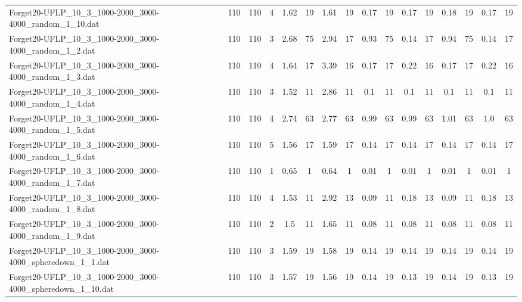 \begin{sidewaystable}[!ht]
{\begin{tabular}{lccccccccccccccc}
Forget20-UFLP\_10\_3\_1000-2000\_3000-4000\_random\_1\_10.dat & 110 & 110 & 4 & 1.62 & 19 & 1.61 & 19 &  \textcolor{blue2}{0.17} & 19 &  \textcolor{blue2}{0.17} & 19 & 0.18 & 19 &  \textcolor{blue2}{0.17} & 19 \\
Forget20-UFLP\_10\_3\_1000-2000\_3000-4000\_random\_1\_2.dat & 110 & 110 & 3 & 2.68 & 75 & 2.94 & 17 & 0.93 & 75 &  \textcolor{blue2}{0.14} & 17 & 0.94 & 75 &  \textcolor{blue2}{0.14} & 17 \\
Forget20-UFLP\_10\_3\_1000-2000\_3000-4000\_random\_1\_3.dat & 110 & 110 & 4 & 1.64 & 17 & 3.39 & 16 &  \textcolor{blue2}{0.17} & 17 & 0.22 & 16 &  \textcolor{blue2}{0.17} & 17 & 0.22 & 16 \\
Forget20-UFLP\_10\_3\_1000-2000\_3000-4000\_random\_1\_4.dat & 110 & 110 & 3 & 1.52 & 11 & 2.86 & 11 & 0.1 & 11 & 0.1 & 11 & 0.1 & 11 & 0.1 & 11 \\
Forget20-UFLP\_10\_3\_1000-2000\_3000-4000\_random\_1\_5.dat & 110 & 110 & 4 & 2.74 & 63 & 2.77 & 63 & 0.99 & 63 & 0.99 & 63 & 1.01 & 63 & 1.0 & 63 \\
Forget20-UFLP\_10\_3\_1000-2000\_3000-4000\_random\_1\_6.dat & 110 & 110 & 5 & 1.56 & 17 & 1.59 & 17 &  \textcolor{blue2}{0.14} & 17 &  \textcolor{blue2}{0.14} & 17 &  \textcolor{blue2}{0.14} & 17 &  \textcolor{blue2}{0.14} & 17 \\
Forget20-UFLP\_10\_3\_1000-2000\_3000-4000\_random\_1\_7.dat & 110 & 110 & 1 & 0.65 & 1 & 0.64 & 1 &  \textcolor{blue2}{0.01} & 1 &  \textcolor{blue2}{0.01} & 1 &  \textcolor{blue2}{0.01} & 1 &  \textcolor{blue2}{0.01} & 1 \\
Forget20-UFLP\_10\_3\_1000-2000\_3000-4000\_random\_1\_8.dat & 110 & 110 & 4 & 1.53 & 11 & 2.92 & 13 &  \textcolor{blue2}{0.09} & 11 & 0.18 & 13 &  \textcolor{blue2}{0.09} & 11 & 0.18 & 13 \\
Forget20-UFLP\_10\_3\_1000-2000\_3000-4000\_random\_1\_9.dat & 110 & 110 & 2 & 1.5 & 11 & 1.65 & 11 &  \textcolor{blue2}{0.08} & 11 &  \textcolor{blue2}{0.08} & 11 &  \textcolor{blue2}{0.08} & 11 &  \textcolor{blue2}{0.08} & 11 \\
Forget20-UFLP\_10\_3\_1000-2000\_3000-4000\_spheredown\_1\_1.dat & 110 & 110 & 3 & 1.59 & 19 & 1.58 & 19 &  \textcolor{blue2}{0.14} & 19 &  \textcolor{blue2}{0.14} & 19 &  \textcolor{blue2}{0.14} & 19 &  \textcolor{blue2}{0.14} & 19 \\
Forget20-UFLP\_10\_3\_1000-2000\_3000-4000\_spheredown\_1\_10.dat & 110 & 110 & 3 & 1.57 & 19 & 1.56 & 19 & 0.14 & 19 &  \textcolor{blue2}{0.13} & 19 & 0.14 & 19 &  \textcolor{blue2}{0.13} & 19 \\

\end{tabular}}
\end{sidewaystable}

